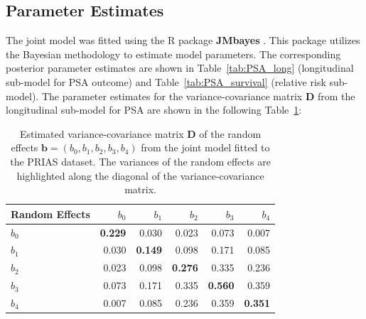 \subsection{Parameter Estimates}
The joint model was fitted using the R package \textbf{JMbayes} \citep{rizopoulosJMbayes}. This package utilizes the Bayesian methodology to estimate model parameters. The corresponding posterior parameter estimates are shown in Table~\ref{tab:PSA_long} (longitudinal sub-model for PSA outcome) and Table~\ref{tab:PSA_survival} (relative risk sub-model). The parameter estimates for the variance-covariance matrix $\boldsymbol{D}$ from the longitudinal sub-model for PSA are shown in the following Table~\ref{tab:D_matrix}:
\begin{table}
\small\sf\centering
\caption{Estimated variance-covariance matrix $\boldsymbol{D}$ of the random effects ${\boldsymbol{b}=(b_{0}, b_{1}, b_{2}, b_{3}, b_{4})}$ from the joint model fitted to the PRIAS dataset. The variances of the random effects are highlighted along the diagonal of the variance-covariance matrix.}
\label{tab:D_matrix}
\begin{tabular}{lrrrrr}
\hline
Random Effects    & $b_{0}$    & $b_{1}$   & $b_{2}$   & $b_{3}$   & $b_{4}$    \\
\hline
$b_{0}$ & \textbf{0.229} & 0.030 & 0.023 & 0.073 & 0.007 \\
$b_{1}$ & 0.030 & \textbf{0.149} & 0.098 & 0.171 & 0.085 \\
$b_{2}$ & 0.023 & 0.098 & \textbf{0.276} & 0.335 & 0.236 \\
$b_{3}$ & 0.073 & 0.171 & 0.335 & \textbf{0.560} & 0.359 \\
$b_{4}$ & 0.007 & 0.085 & 0.236 & 0.359 & \textbf{0.351} \\
\hline
\end{tabular}
\end{table}

